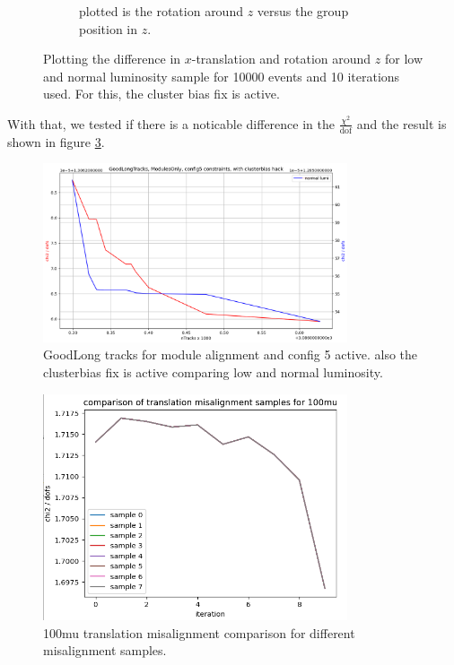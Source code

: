 \begin{figure}
\begin{subfigure}[b]{0.48\textwidth}
    \caption{plotted is the rotation around $z$ versus the group position in $z$.}
    \label{fig:compare_rz}
  \end{subfigure}
  \caption{Plotting the difference in $x$-translation and rotation around $z$ for low and normal luminosity sample for 10000 events and 10 iterations used. For this, the cluster bias fix is active.}
  \label{fig:lumi_low_normal_hack_on}
\end{figure}

With that, we tested if there is a noticable difference in the $\frac{\chi^2}{\text{dof}}$
and the result is shown in figure \ref{fig:GL_lumi_low_normal_hack_on}.

\begin{figure}
  \centering
  \includegraphics[width=0.8\textwidth]{plots/feb_2_2022/GL_modules_c5_cb_hackactive_low_normal_lumi.png}
  \caption{GoodLong tracks for module alignment and config 5 active. also the clusterbias fix is active comparing low and normal luminosity.}
  \label{fig:GL_lumi_low_normal_hack_on}
\end{figure}

\begin{figure}
  \centering
  \includegraphics[width=0.8\textwidth]{plots/feb_6_2022/100mu_misalignment_samples_compared.png}
  \caption{100mu translation misalignment comparison for different misalignment samples.}
  \label{fig:100muT}
\end{figure}

